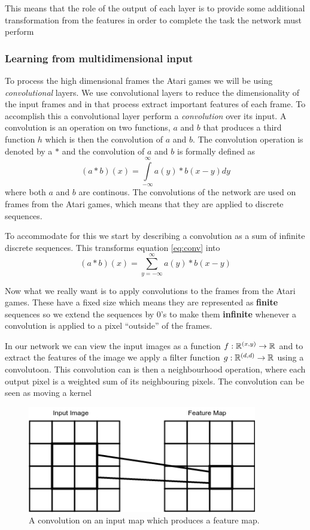 \documentclass[11pt]{article}
\begin{document}
This means that the role of the output of each layer is to provide some additional
transformation from the features in order to complete the task the network
must perform\cite{DeepLearningBook}

\subsubsection{Learning from multidimensional input}

To process the high dimensional frames the Atari games we will be using
\textit{convolutional} layers.
We use convolutional layers to reduce the dimensionality of the
input frames and in that process extract important features of each frame.
To accomplish this a convolutional layer perform a \textit{convolution} over
its input.
A convolution is an operation on two functions, $a$ and $b$ that produces a third function
$h$ which is then the convolution of $a$ and $b$\cite{DeepLearningBook}.
The convolution operation is denoted by a $\ast$ and the convolution of $a$ and $b$
is formally defined as
\begin{equation}\label{eq:conv}
    (a \ast b)(x) = \int\limits_{-\infty}^{\infty} a(y) * b(x - y) dy
\end{equation}
where both $a$ and $b$ are continous.
The convolutions of the network are used on frames from the Atari games, which
means that they are applied to discrete sequences.

To accommodate for this we start by describing a convolution as a sum of infinite
discrete sequences.
This transforms equation \ref{eq:conv} into
\begin{equation}
    (a \ast b)(x) = \sum\limits_{y = -\infty}^{\infty} a(y) * b(x - y)
\end{equation}

Now what we really want is to apply convolutions to the frames from the Atari games.
These have a fixed size which means they are represented as \textbf{finite} sequences
so we extend the sequences by 0's to make them \textbf{infinite} whenever a convolution
is applied to a pixel “outside” of the frames.

In our network we can view the input images as a function $f : \mathbb{R}^{(x, y)} \to \mathbb{R}$ and
to extract the features of the image we apply a filter function $g : \mathbb{R}^{(d, d)} \to \mathbb{R}$
using a convolutoon.
This convolution can is then a neighbourhood operation, where each output pixel
is a weighted sum of its neighbouring pixels\cite{convSE}.
The convolution can be seen as moving a kernel
\begin{figure}[!h]
    \centering
    \includegraphics[width=10cm]{include/conv.png}
    \caption{A convolution on an input map which produces a feature map.}
    \label{fig:neuron}
\end{figure}
\end{document}
